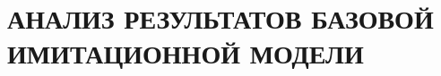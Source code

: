 \section[Анализ результатов базовой имитационной модели]{
  АНАЛИЗ РЕЗУЛЬТАТОВ БАЗОВОЙ \\
  ИМИТАЦИОННОЙ МОДЕЛИ}
\label{sec:base_analysis}
